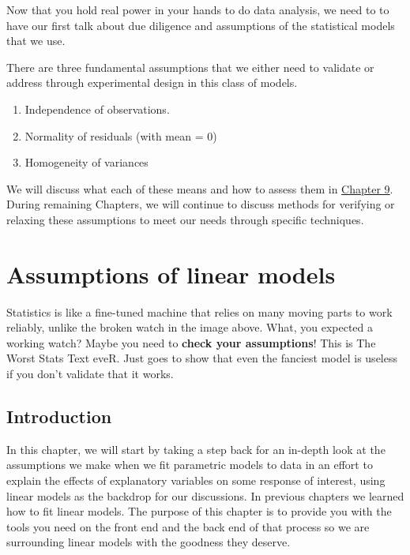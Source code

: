 \documentclass[
]{book}
\providecommand{\tightlist}{%
  \setlength{\itemsep}{0pt}\setlength{\parskip}{0pt}}
\begin{document}
Now that you hold real power in your hands to do data analysis, we need to to have our first talk about due diligence and assumptions of the statistical models that we use.

There are three fundamental assumptions that we either need to validate or address through experimental design in this class of models.

\begin{enumerate}
\def\labelenumi{\arabic{enumi}.}
\tightlist
\item
  Independence of observations.
\item
  Normality of residuals (with mean = 0)
\item
  Homogeneity of variances
\end{enumerate}

We will discuss what each of these means and how to assess them in \protect\hyperlink{Chapter9}{Chapter 9}. During remaining Chapters, we will continue to discuss methods for verifying or relaxing these assumptions to meet our needs through specific techniques.

\hypertarget{Chapter9}{%
\chapter{Assumptions of linear models}\label{Chapter9}}

Statistics is like a fine-tuned machine that relies on many moving parts to work reliably, unlike the broken watch in the image above. What, you expected a working watch? Maybe you need to \textbf{check your assumptions}! This is The Worst Stats Text eveR. Just goes to show that even the fanciest model is useless if you don't validate that it works.

\hypertarget{intro9}{%
\section{Introduction}\label{intro9}}

In this chapter, we will start by taking a step back for an in-depth look at the assumptions we make when we fit parametric models to data in an effort to explain the effects of explanatory variables on some response of interest, using linear models as the backdrop for our discussions. In previous chapters we learned how to fit linear models. The purpose of this chapter is to provide you with the tools you need on the front end and the back end of that process so we are surrounding linear models with the goodness they deserve.
\end{document}
